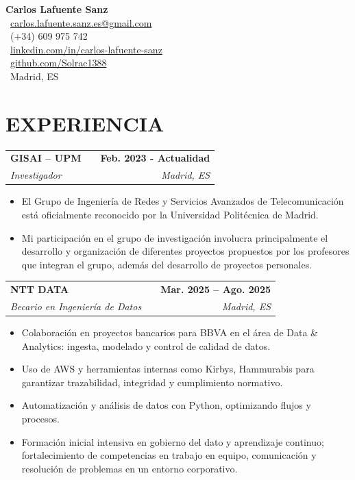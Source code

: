 \documentclass[a4paper,10pt]{article}
\makeatletter
\newcommand{\smallblacksquare}{\raisebox{0.4ex}{\rule{0.6ex}{0.6ex}}}
\newenvironment{joblong}[4]
{
	\begin{tabularx}{\linewidth}{@{}l X r@{}}
		\textbf{#1} & \hfill & \textbf{#2} \\
		\small\textit{#3} & \hfill & \small\textit{#4} \\[3.75pt]
	\end{tabularx}
	\begin{minipage}[t]{\linewidth}
		\begin{itemize}[nosep,after=\strut, leftmargin=1em, itemsep=3pt,label=\smallblacksquare]
		}
		{
		\end{itemize}
	\end{minipage}    
}
\makeatother
\begin{document}
	
	\pagestyle{empty} 
	
	
	\begin{flushleft}
		\Huge{\textbf{Carlos Lafuente Sanz}} \\[4pt]
		\vspace{4pt}
		\normalsize
		\faEnvelope \ \href{mailto:carlos.lafuente.sanz.es@gmail.com}{carlos.lafuente.sanz.es@gmail.com} \\
		\faMobile \ (+34) 609 975 742 \\
		\faLinkedin \ \href{https://linkedin.com/in/carlos-lafuente-sanz}{linkedin.com/in/carlos-lafuente-sanz} \\
		\faGithub \ \href{https://github.com/Solrac1388}{github.com/Solrac1388} \\
		\faHome \ Madrid, ES
	\end{flushleft}
	\vspace{-10pt}
	\noindent\titlerule
	\vspace{8pt}
	
	
	\section{EXPERIENCIA}
	
	\begin{joblong}{GISAI – UPM}{Feb. 2023 - Actualidad}{Investigador}{Madrid, ES}
		\item El Grupo de Ingeniería de Redes y Servicios Avanzados de Telecomunicación está oficialmente reconocido por la Universidad Politécnica de Madrid.
		\item Mi participación en el grupo de investigación involucra principalmente el desarrollo y organización de diferentes proyectos propuestos por los profesores que integran el grupo, además del desarrollo de proyectos personales.
	\end{joblong}
	
	\begin{joblong}{NTT DATA}{Mar. 2025 – Ago. 2025}{Becario en Ingeniería de Datos}{Madrid, ES}
		\item Colaboración en proyectos bancarios para BBVA en el área de Data \& Analytics: ingesta, modelado y control de calidad de datos.
		\item Uso de AWS y herramientas internas como Kirbys, Hammurabis para garantizar trazabilidad, integridad y cumplimiento normativo.
		\item Automatización y análisis de datos con Python, optimizando flujos y procesos.
		\item Formación inicial intensiva en gobierno del dato y aprendizaje continuo; fortalecimiento de competencias en trabajo en equipo, comunicación y resolución de problemas en un entorno corporativo.
	\end{joblong}
	
\end{document}
